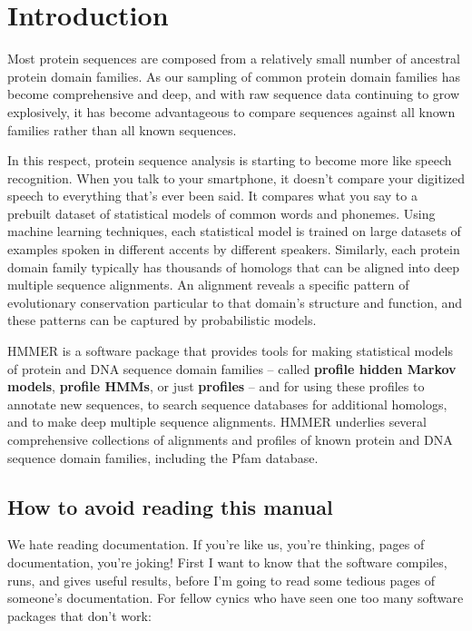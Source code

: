 \newpage
\chapter{Introduction}
\label{chapter:introduction}
\setcounter{footnote}{0}

Most protein sequences are composed from a relatively small number of
ancestral protein domain families. As our sampling of common protein
domain families has become comprehensive and deep, and with raw
sequence data continuing to grow explosively, it has become
advantageous to compare sequences against all known families rather
than all known sequences.

In this respect, protein sequence analysis is starting to become more
like speech recognition.  When you talk to your smartphone, it doesn't
compare your digitized speech to everything that's ever been said. It
compares what you say to a prebuilt dataset of statistical models of
common words and phonemes.  Using machine learning techniques, each
statistical model is trained on large datasets of examples spoken in
different accents by different speakers. Similarly, each protein
domain family typically has thousands of homologs that can be aligned
into deep multiple sequence alignments. An alignment reveals a
specific pattern of evolutionary conservation particular to that
domain's structure and function, and these patterns can be captured by
probabilistic models.

HMMER is a software package that provides tools for making statistical
models of protein and DNA sequence domain families -- called
\textbf{profile hidden Markov models}, \textbf{profile HMMs}, or just
\textbf{profiles} -- and for using these profiles to annotate new
sequences, to search sequence databases for additional homologs, and
to make deep multiple sequence alignments.  HMMER underlies several
comprehensive collections of alignments and profiles of known protein
and DNA sequence domain families, including the Pfam
database.


\section{How to avoid reading this manual}

We hate reading documentation. If you're like us, you're thinking,
\pageref*{manualend} pages of documentation, you're joking! First I
want to know that the software compiles, runs, and gives useful
results, before I'm going to read some \pageref*{manualend} tedious
pages of someone's documentation. For fellow cynics who have seen one
too many software packages that don't work:


